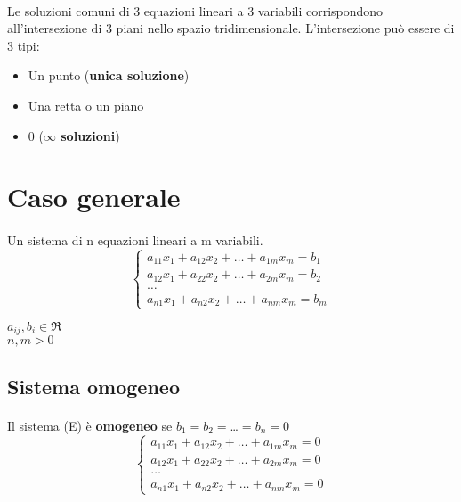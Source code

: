 \documentclass[a4paper, 12pt]{report}
\begin{document}
            \paragraph{}Le soluzioni comuni di 3 equazioni lineari a 3 variabili corrispondono all'intersezione di 3 piani nello spazio tridimensionale.
            L'intersezione può essere di 3 tipi:
            \begin{itemize}
                \item Un punto (\textbf{unica soluzione})
                \item Una retta o un piano
                \item 0 (\textbf{$\infty$ soluzioni})
            \end{itemize}
        \section{Caso generale}
        \paragraph{}Un sistema di n equazioni lineari a m variabili.
        $$\begin{cases}
            a_{11}x_1+a_{12}x_2+\dots+a_{1m}x_m=b_1\\
            a_{12}x_1+a_{22}x_2+\dots+a_{2m}x_m=b_2\\
            \dots\\
            a_{n1}x_1+a_{n2}x_2+\dots+a_{nm}x_m=b_m
        \end{cases}$$
        \begin{center}
            $a_{ij},b_i\in\Re$\\
            $n,m > 0$\\
        \end{center}
        \subsection{Sistema omogeneo}   
        \paragraph{}Il sistema (E) è \textbf{omogeneo} se $b_1=b_2=$\dots$=b_n=0$ 
            $$\begin{cases}
                a_{11}x_1+a_{12}x_2+\dots+a_{1m}x_m=0\\
                a_{12}x_1+a_{22}x_2+\dots+a_{2m}x_m=0\\
                \dots\\
                a_{n1}x_1+a_{n2}x_2+\dots+a_{nm}x_m=0
            \end{cases}$$
\end{document}
